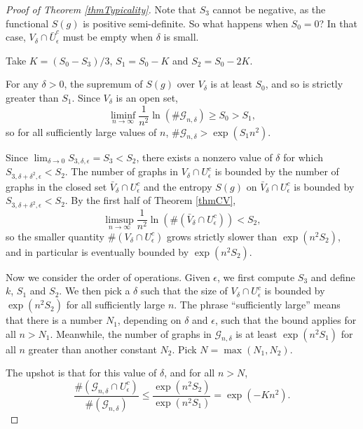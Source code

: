 \documentclass[12pt]{amsart}
\newcommand{\1}{\mathbf{1}}
\begin{document}
\begin{proof}[Proof of Theorem \ref{thmTypicality}]
Note that $S_3$ cannot be negative, as the functional $S(g)$ is 
positive semi-definite. So what happens when $S_0=0$? In that case, 
$V_\delta \cap \bar U_\epsilon^c$ must be empty when $\delta$ is small. 

\medskip

 Take $K = (S_0-S_3)/3$, $S_1 = S_0-K$ and $S_2=S_0-2K$.

\medskip

 For any $\delta>0$, the supremum of $S(g)$ over 
$V_\delta$ is at least
$S_0$, and so is strictly greater than $S_1$. Since $V_\delta$ is 
an open set, 
\begin{equation} \liminf_{n\to \infty}
\frac{1}{n^2} \ln(\# {\mathcal{G}}_{n,\delta}) \ge S_0 > S_1,
\end{equation} 
so for all sufficiently large values of $n$, $\# \mathcal{G}_{n,\delta} > \exp(S_1
n^2)$.

\medskip

 Since $\lim_{\delta \to 0} S_{3,\delta,\epsilon}
= S_3 < S_2$,
there exists a nonzero value of $\delta$ for which
$S_{3,\delta+\delta^2,\epsilon} < S_2$. The number of graphs in 
$V_{\delta} \cap U_\epsilon^c$ 
is bounded by the number of graphs in the closed set $\bar V_\delta \cap U_\epsilon^c$
and the entropy $S(g)$ on $\bar V_\delta \cap U_\epsilon^c$ is bounded by 
$S_{3,\delta+\delta^2,\epsilon} < S_2$. 
By the first half of Theorem \ref{thmCV},  
\begin{equation} \limsup_{n\to \infty}
\frac{1}{n^2} \ln(\# (\bar V_\delta \cap U_\epsilon^c)) <S_2,
\end{equation} 
so the smaller quantity $\#(V_\delta \cap U_\epsilon^c)$ grows strictly
slower than $\exp(n^2 S_2)$,
and in particular is eventually bounded by $\exp(n^2 S_2)$.

\medskip

 Now we consider the order of operations. Given
$\epsilon$, we first compute $S_3$ and define $k$, $S_1$ and $S_2$. We then pick a $\delta$
such that the size of $V_{\delta} \cap U_\epsilon^c$ is bounded by $\exp(n^2 S_2)$
for all sufficiently large $n$. The phrase ``sufficiently large'' means that
there is a number $N_1$, depending on $\delta$ and $\epsilon$, such that the bound
applies for all $n>N_1$. Meanwhile, the number of graphs in $\mathcal{G}_{n,\delta}$ 
is at least $\exp(n^2 S_1)$ for all $n$ greater than another constant $N_2$. 
Pick $N = \max(N_1, N_2)$.

The upshot is that for this value of $\delta$, and for all $n>N$,
\[ \frac{\#(\mathcal{G}_{n,\delta} \cap
U_\epsilon^c)}{\#(\mathcal{G}_{n,\delta})}
\le \frac{\exp(n^2 S_2)}{\exp(n^2 S_1)} = \exp(-Kn^2). \]


\end{proof}
\end{document}
